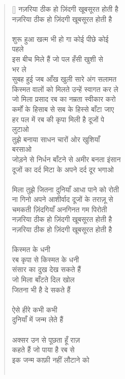 \begin{verse}[\versewidth]\texthindi{
नज़रिया ठीक हो ज़िंदगी खूबसूरत होती है\\
नज़रिया ठीक हो ज़िंदगी खूबसूरत होती है\\
\\
शुरू हुआ खत्म भी हो गा कोई पीछे कोई\\
पहले\\
इस बीच मिले हैं जो पल हँसी खुशी से\\
भर ले\\
सुबह हुई जब आँख खुली सारे अंग सलामत\\
किस्मत वालों को मिलते उन्हें स्वागत कर ले\\
जो मिला प्रसाद रब का नम्रता स्वीकार करो\\
कर्मों के हिसाब से सब के हिस्से बाँटा जाए\\
हर पल में रब की कृपा मिली है दूजों पे\\
लुटाओ\\
तुझे बनाया साधन चारों ओर खुशियाँ\\
बरसाओ\\
जोड़ने से निर्धन बाँटने से अमीर बनता इंसान\\
दूजों का दर्द मिटा के अपने दर्द दूर भगाओ\\
\\
मिला तुझे जितना दुनियाँ आधा पाने को रोती\\
ना गिनो अपने आशीर्वाद दूजों के तराज़ू से\\
चमकती ज़िंदगियाँ अनगिनत गम पिरोती \\
नज़रिया ठीक हो ज़िंदगी खूबसूरत होती है\\
नज़रिया ठीक हो ज़िंदगी खूबसूरत होती है\\
\\
किस्मत के धनी\\
रब कृपा से किस्मत के धनी\\
संसार का दुख देख सकते हैं\\
जो मिला बाँटते दिल खोल\\
जितना भी है दे सकते हैं\\
\\
ऐसे हीरे कभी कभी\\
दुनियाँ में जन्म लेते हैं\\
\\
अक्सर उन से पूछता हूँ राज़\\
कहते हैं जो पाया है रब से\\
इक जन्म काफ़ी नहीं लौटाने को\\
\\
}
\end{verse}
